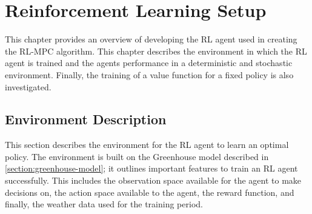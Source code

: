 \chapter{Reinforcement Learning Setup}
\label{chapter:RL}
This chapter provides an overview of developing the RL agent used in creating the RL-MPC algorithm. This chapter describes the environment in which the RL agent is trained and the agents performance in a deterministic and stochastic environment. Finally, the training of a value function for a fixed policy is also investigated. 

\section{Environment Description} \label{section:env-description}
This section describes the environment for the RL agent to learn an optimal policy. The environment is built on the Greenhouse model described in \autoref{section:greenhouse-model}; it outlines important features to train an RL agent successfully. This includes the observation space available for the agent to make decisions on, the action space available to the agent, the reward function, and finally, the weather data used for the training period.


